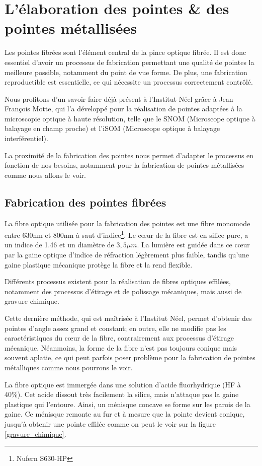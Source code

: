 \section{L'élaboration des pointes \& des pointes métallisées}
Les pointes fibrées sont l'élément central de la pince optique fibrée. Il est donc essentiel d'avoir un processus de fabrication permettant une qualité de pointes la meilleure possible, notamment du point de vue forme. De plus, une fabrication reproductible est essentielle, ce qui nécessite un processus correctement contrôlé.

Nous profitons d'un savoir-faire déjà présent à l'Institut Néel grâce à Jean-François Motte, qui l'a développé pour la réalisation de pointes adaptées à la microscopie optique à haute résolution, telle que le SNOM (Microscope optique à balayage en champ proche) et l'iSOM (Microscope optique à balayage interférentiel).

La proximité de la fabrication des pointes nous permet d'adapter le processus en fonction de nos besoins, notamment pour la fabrication de pointes métallisées comme nous allons le voir.

\subsection{Fabrication des pointes fibrées}
La fibre optique utilisée pour la fabrication des pointes est une fibre monomode entre 630nm et 800nm à saut d'indice\footnote{Nufern S630-HP}. Le cœur de la fibre est en silice pure, a un indice de 1.46 et un diamètre de $3,5\mu m$. La lumière est guidée dans ce cœur par la gaine optique d'indice de réfraction légèrement plus faible, tandis qu'une gaine plastique mécanique protège la fibre et la rend flexible.

Différents processus existent pour la réalisation de fibres optiques effilées, notamment des processus d'étirage et de polissage mécaniques, mais aussi de gravure chimique. 

Cette dernière méthode, qui est maîtrisée à l'Institut Néel, permet d'obtenir des pointes d'angle assez grand et constant; en outre, elle ne modifie pas les caractéristiques du cœur de la fibre, contrairement aux processus d'étirage mécanique. Néanmoins, la forme de la fibre n'est pas toujours conique mais souvent aplatie, ce qui peut parfois poser problème pour la fabrication de pointes métalliques comme nous pourrons le voir.

La fibre optique est immergée dans une solution d'acide fluorhydrique (HF à 40\%). Cet acide dissout très facilement la silice, mais n'attaque pas la gaine plastique qui l'entoure. Ainsi, un ménisque concave se forme sur les parois de la gaine. Ce ménisque remonte au fur et à mesure que la pointe devient conique, jusqu'à obtenir une pointe effilée comme on peut le voir sur la figure \ref{gravure_chimique}.

